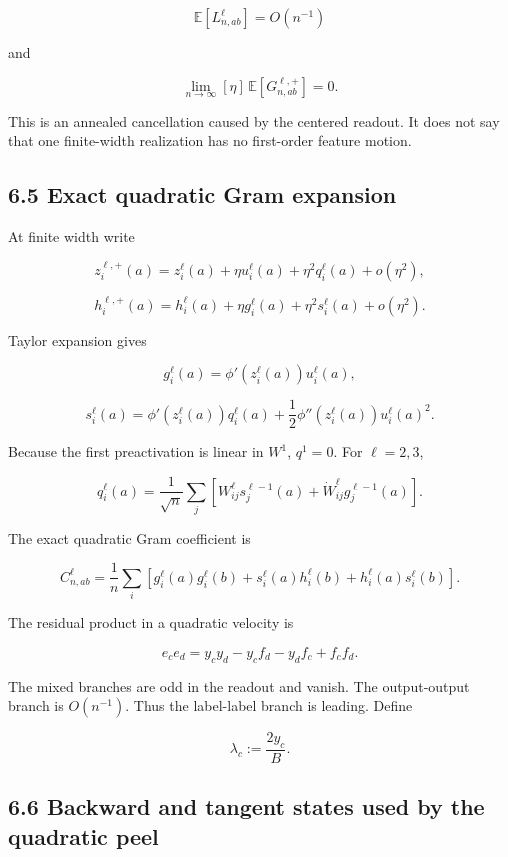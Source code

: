 \[
\mathbb E[L^\ell_{n,ab}]=O(n^{-1})
\]


and

\[
\boxed{
\lim_{n\to\infty}
[\eta]\,\mathbb E[G^{\ell,+}_{n,ab}]
=
0.
}
\]


This is an annealed cancellation caused by the centered readout. It does not
say that one finite-width realization has no first-order feature motion.

\subsection*{6.5 Exact quadratic Gram expansion}


At finite width write

\[
z_i^{\ell,+}(a)
=
z_i^\ell(a)+\eta u_i^\ell(a)+\eta^2q_i^\ell(a)+o(\eta^2),
\]


\[
h_i^{\ell,+}(a)
=
h_i^\ell(a)+\eta g_i^\ell(a)+\eta^2s_i^\ell(a)+o(\eta^2).
\]


Taylor expansion gives

\[
g_i^\ell(a)
=
\phi'(z_i^\ell(a))u_i^\ell(a),
\]


\[
s_i^\ell(a)
=
\phi'(z_i^\ell(a))q_i^\ell(a)
+\frac12\phi''(z_i^\ell(a))u_i^\ell(a)^2.
\]


Because the first preactivation is linear in \(W^1\), \(q^1=0\). For
\(\ell=2,3\),

\[
q_i^\ell(a)
=
\frac1{\sqrt n}\sum_j
\left[
W^\ell_{ij}s_j^{\ell-1}(a)
+\dot W^\ell_{ij}g_j^{\ell-1}(a)
\right].
\]


The exact quadratic Gram coefficient is

\[
\boxed{
C^\ell_{n,ab}
=
\frac1n\sum_i
\left[
g_i^\ell(a)g_i^\ell(b)
+s_i^\ell(a)h_i^\ell(b)
+h_i^\ell(a)s_i^\ell(b)
\right].
}
\]


The residual product in a quadratic velocity is

\[
e_ce_d
=
y_cy_d-y_cf_d-y_df_c+f_cf_d.
\]


The mixed branches are odd in the readout and vanish. The output-output
branch is \(O(n^{-1})\). Thus the label-label branch is leading. Define

\[
\lambda_c:=\frac{2y_c}{B}.
\]


\subsection*{6.6 Backward and tangent states used by the quadratic peel}


